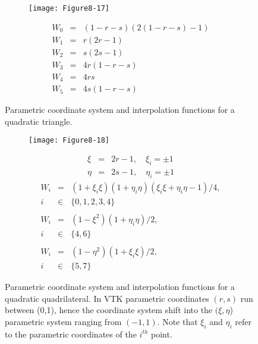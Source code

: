 \begin{figure}[!htb]
	\centering
	\begin{subfigure}{0.48\linewidth}
		\centering
		\texttt{[image: Figure8-17]}
		\caption*{}
	\end{subfigure}
	\hfill
	\begin{subfigure}{0.48\linewidth}
		\centering
		\begin{equation*}
		\begin{array}{lll}
		W_0 &=& (1 - r - s)(2(1 - r - s) - 1) \\
		W_1 &=& r (2 r - 1) \\
		W_2 &=& s(2s - 1) \\
		W_3 &=& 4 r (1 - r - s) \\
		W_4 &=& 4 r s \\
		W_5 &=& 4 s (1 - r - s)	
		\end{array}
		\end{equation*}
	\end{subfigure}%
	\caption{Parametric coordinate system and interpolation functions for a quadratic triangle.}
	\label{fig:Figure8-17}
\end{figure}

\begin{figure}[!htb]
	\centering
	\begin{subfigure}{0.48\linewidth}
		\centering
		\texttt{[image: Figure8-18]}
		\caption*{}
	\end{subfigure}
	\hfill
	\begin{subfigure}{0.48\linewidth}
		\centering
		\begin{equation*}
		\begin{array}{lll}
		\xi &=& 2 r  - 1, \quad \xi_i = \pm 1 \\
		\eta &=& 2 s - 1, \quad \eta_i = \pm 1
		\end{array}
		\end{equation*}
		\begin{equation*}
		\begin{array}{lll}
		W_i &=& (1 + \xi_i \xi)(1 + \eta_i \eta)(\xi_i \xi + \eta_i \eta - 1)/4, \\
		i &\in& \lbrace 0, 1, 2, 3, 4 \rbrace \\ \\
		W_i &=& (1 - \xi^2)(1 + \eta_i \eta)/2,\\
		i &\in& \lbrace 4, 6 \rbrace  \\ \\
		W_i &=& (1 - \eta^2)(1 + \xi_i \xi)/2, \\
		i &\in& \lbrace 5, 7 \rbrace	
		\end{array}
		\end{equation*}
	\end{subfigure}%
	\caption{Parametric coordinate system and interpolation functions for a quadratic quadrilateral. In VTK parametric coordinates $(r,s)$ run between (0,1), hence the coordinate system shift into the $(\xi, \eta$) parametric system ranging from $(-1,1)$. Note that $\xi_i$ and $\eta_i$ refer to the parametric coordinates of the $i^{th}$ point.}
	\label{fig:Figure8-18}
\end{figure}


